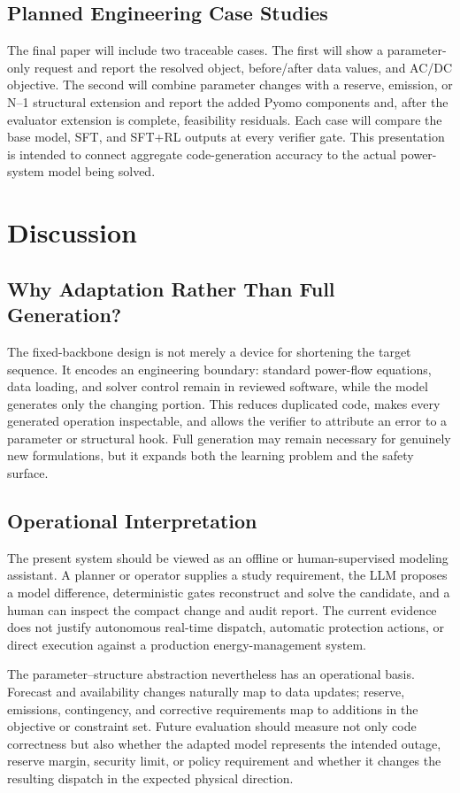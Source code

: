\documentclass[lettersize,journal]{IEEEtran}
\begin{document}
\subsection{Planned Engineering Case Studies}
The final paper will include two traceable cases. The first will show a parameter-only request and report the resolved object, before/after data values, and AC/DC objective. The second will combine parameter changes with a reserve, emission, or N--1 structural extension and report the added Pyomo components and, after the evaluator extension is complete, feasibility residuals. Each case will compare the base model, SFT, and SFT+RL outputs at every verifier gate. This presentation is intended to connect aggregate code-generation accuracy to the actual power-system model being solved.

\section{Discussion}
\subsection{Why Adaptation Rather Than Full Generation?}
The fixed-backbone design is not merely a device for shortening the target sequence. It encodes an engineering boundary: standard power-flow equations, data loading, and solver control remain in reviewed software, while the model generates only the changing portion. This reduces duplicated code, makes every generated operation inspectable, and allows the verifier to attribute an error to a parameter or structural hook. Full generation may remain necessary for genuinely new formulations, but it expands both the learning problem and the safety surface.

\subsection{Operational Interpretation}
The present system should be viewed as an offline or human-supervised modeling assistant. A planner or operator supplies a study requirement, the LLM proposes a model difference, deterministic gates reconstruct and solve the candidate, and a human can inspect the compact change and audit report. The current evidence does not justify autonomous real-time dispatch, automatic protection actions, or direct execution against a production energy-management system.

The parameter--structure abstraction nevertheless has an operational basis. Forecast and availability changes naturally map to data updates; reserve, emissions, contingency, and corrective requirements map to additions in the objective or constraint set. Future evaluation should measure not only code correctness but also whether the adapted model represents the intended outage, reserve margin, security limit, or policy requirement and whether it changes the resulting dispatch in the expected physical direction.
\end{document}
